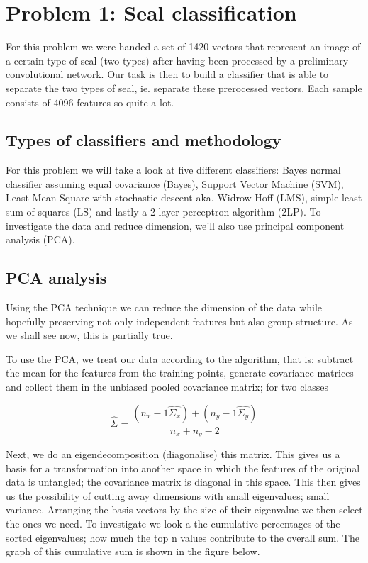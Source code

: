 \documentclass[12pt, a4paper]{article}
\begin{document}



\tableofcontents
\newpage




\section{Problem 1: Seal classification}

For this problem we were handed a set of 1420 vectors that represent an image of a certain type of seal (two types) after having been processed by a preliminary convolutional network. Our task is then to build a classifier that is able to separate the two types of seal, ie. separate these prerocessed vectors. Each sample consists of  4096 features so quite a lot.

\subsection{Types of classifiers and methodology}
For this problem we will take a look at five different classifiers: Bayes normal classifier assuming equal covariance (Bayes), Support Vector Machine (SVM), Least Mean Square with stochastic descent aka. Widrow-Hoff (LMS), simple least sum of squares (LS) and lastly a 2 layer perceptron algorithm (2LP). To investigate the data and reduce dimension, we'll also use principal component analysis (PCA).


\subsection{PCA analysis }
Using the PCA technique we can reduce the dimension of the data while hopefully preserving not only independent features but also group structure. As we shall see now, this is partially true.

To use the PCA, we treat our data according to the algorithm, that is: subtract the mean for the features from the training points, generate covariance matrices and collect them in the unbiased pooled covariance matrix; for two classes

\[
    \hat{\Sigma} = \frac{(n_x-1\hat{\Sigma_x}) + (n_y-1\hat{\Sigma_y})}{n_x+n_y-2}
\]

Next, we do an eigendecomposition (diagonalise) this matrix. This gives us a basis for a transformation into another space in which the features of the original data is untangled; the covariance matrix is diagonal in this space. This then gives us the possibility of cutting away dimensions with small eigenvalues; small variance. Arranging the basis vectors by the size of their eigenvalue we then select the ones we need. To investigate we look a the cumulative percentages of the sorted eigenvalues; how much the top n values contribute to the overall sum. The graph of this cumulative sum is shown in the figure below.
\end{document}
